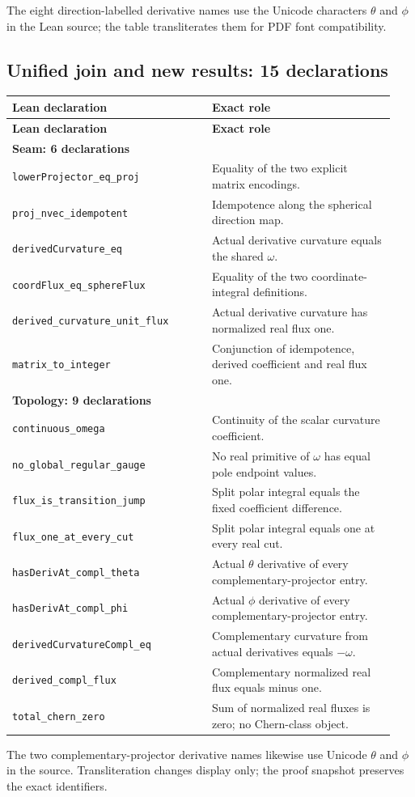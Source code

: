 \documentclass[11pt]{article}
\theoremstyle{definition}\newtheorem{definition}[theorem]{Definition}
\theoremstyle{remark}\newtheorem{remark}[theorem]{Remark}
\begin{document}
The eight direction-labelled derivative names use the Unicode characters $\theta$ and $\phi$ in the Lean source; the table transliterates them for PDF font compatibility.

\subsection*{Unified join and new results: 15 declarations}
\begin{longtable}{p{0.49\linewidth}p{0.45\linewidth}}
\toprule\textbf{Lean declaration} & \textbf{Exact role}\\\midrule\endfirsthead
\toprule\textbf{Lean declaration} & \textbf{Exact role}\\\midrule\endhead
\multicolumn{2}{l}{\textbf{Seam: 6 declarations}}\\
\texttt{lowerProjector\_eq\_proj} & Equality of the two explicit matrix encodings.\\
\texttt{proj\_nvec\_idempotent} & Idempotence along the spherical direction map.\\
\texttt{derivedCurvature\_eq} & Actual derivative curvature equals the shared $\omega$.\\
\texttt{coordFlux\_eq\_sphereFlux} & Equality of the two coordinate-integral definitions.\\
\texttt{derived\_curvature\_unit\_flux} & Actual derivative curvature has normalized real flux one.\\
\texttt{matrix\_to\_integer} & Conjunction of idempotence, derived coefficient and real flux one.\\
\midrule\multicolumn{2}{l}{\textbf{Topology: 9 declarations}}\\
\texttt{continuous\_omega} & Continuity of the scalar curvature coefficient.\\
\texttt{no\_global\_regular\_gauge} & No real primitive of $\omega$ has equal pole endpoint values.\\
\texttt{flux\_is\_transition\_jump} & Split polar integral equals the fixed coefficient difference.\\
\texttt{flux\_one\_at\_every\_cut} & Split polar integral equals one at every real cut.\\
\texttt{hasDerivAt\_compl\_theta} & Actual $\theta$ derivative of every complementary-projector entry.\\
\texttt{hasDerivAt\_compl\_phi} & Actual $\phi$ derivative of every complementary-projector entry.\\
\texttt{derivedCurvatureCompl\_eq} & Complementary curvature from actual derivatives equals $-\omega$.\\
\texttt{derived\_compl\_flux} & Complementary normalized real flux equals minus one.\\
\texttt{total\_chern\_zero} & Sum of normalized real fluxes is zero; no Chern-class object.\\
\bottomrule
\end{longtable}
The two complementary-projector derivative names likewise use Unicode $\theta$ and $\phi$ in the source. Transliteration changes display only; the proof snapshot preserves the exact identifiers.
\end{document}

